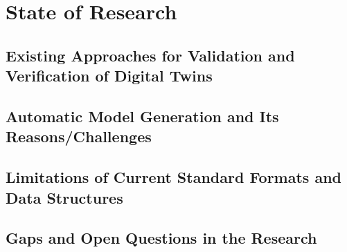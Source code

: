 \chapter{State of Research}
\label{chap:research}

\section{Existing Approaches for Validation and Verification of Digital Twins}

\section{Automatic Model Generation and Its Reasons/Challenges}


\section{Limitations of Current Standard Formats and Data Structures}

\section{Gaps and Open Questions in the Research}
